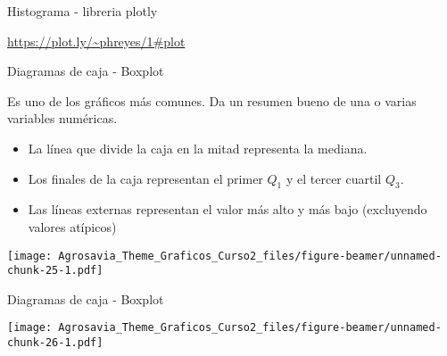 \documentclass[ignorenonframetext,]{beamer}
\newenvironment{Shaded}{\begin{snugshade}}{\end{snugshade}}
\newcommand{\KeywordTok}[1]{\textcolor[rgb]{0.13,0.29,0.53}{\textbf{#1}}}
\newcommand{\DataTypeTok}[1]{\textcolor[rgb]{0.13,0.29,0.53}{#1}}
\newcommand{\StringTok}[1]{\textcolor[rgb]{0.31,0.60,0.02}{#1}}
\newcommand{\CommentTok}[1]{\textcolor[rgb]{0.56,0.35,0.01}{\textit{#1}}}
\newcommand{\OperatorTok}[1]{\textcolor[rgb]{0.81,0.36,0.00}{\textbf{#1}}}
\newcommand{\NormalTok}[1]{#1}
\begin{document}
\begin{frame}[fragile]{Histograma - libreria plotly}

\begin{Shaded}
\end{Shaded}

\url{https://plot.ly/~phreyes/1#plot}

\end{frame}

\begin{frame}{Diagramas de caja - Boxplot}

Es uno de los gráficos más comunes. Da un resumen bueno de una o varias
variables numéricas.\\

\begin{itemize}
\item La línea que divide la caja en la mitad representa la mediana. 
\item Los finales de la caja representan el primer $Q_{1}$ y el tercer cuartil $Q_{3}$.
\item Las líneas externas representan el valor más alto y más bajo (excluyendo valores atípicos)
\end{itemize}

\texttt{[image: Agrosavia\_Theme\_Graficos\_Curso2\_files/figure-beamer/unnamed-chunk-25-1.pdf]}

\end{frame}

\begin{frame}[fragile]{Diagramas de caja - Boxplot}

\begin{Shaded}
\end{Shaded}

\texttt{[image: Agrosavia\_Theme\_Graficos\_Curso2\_files/figure-beamer/unnamed-chunk-26-1.pdf]}

\end{frame}
\end{document}
